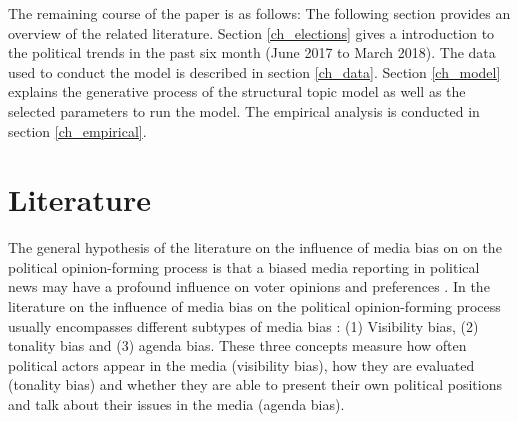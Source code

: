 \documentclass[12pt,a4paper,notitlepage]{article}
\begin{document}

The remaining course of the paper is as follows: The following section provides an overview of the related literature. Section \ref{ch_elections} gives a introduction to the political trends in the past six month (June 2017 to March 2018). The data used to conduct the model is described in section \ref{ch_data}. Section \ref{ch_model} explains the generative process of the structural topic model as well as the selected parameters to run the model. The empirical analysis is conducted in section \ref{ch_empirical}. 


\section{Literature}

The general hypothesis of the literature on the influence of media bias on on the political opinion-forming process is that a biased media reporting in political news may have a profound influence on voter opinions and preferences \citep{ferree_four_2002, mccombs_look_2005, eberl_one_2017}. In the literature on the influence of media bias on the political opinion-forming process usually encompasses different subtypes of media bias \citep{eberl_one_2017, dalessio_media_2000}: (1) Visibility bias, (2) tonality bias and (3) agenda bias. These three concepts measure how often political actors appear in the media (visibility bias), how they are evaluated (tonality bias) and whether they are able to present their own political positions and talk about their issues in the media (agenda bias).
  
\end{document}
